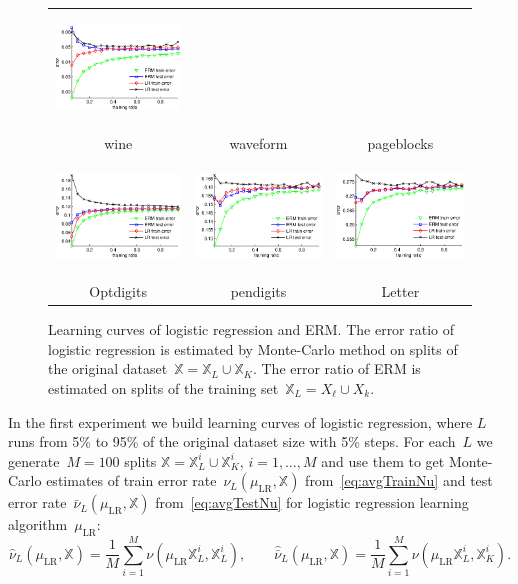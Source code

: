 \documentclass{article} %
\def\XX{\mathbb{X}}
\def\LR{\text{LR}}
\begin{document}
\begin{figure}[t]
\begin{tabular}{ccc}
        \includegraphics[width=44mm,height=30mm]{pageblocks.eps} \\
        wine &
        waveform &
        pageblocks \\
        \includegraphics[width=44mm,height=30mm]{Optdigits.eps} &
        \includegraphics[width=44mm,height=30mm]{pendigits.eps} &
        \includegraphics[width=44mm,height=30mm]{Letter.eps} \\
        Optdigits &
        pendigits &
        Letter \\
    \end{tabular}
    \caption{Learning curves of logistic regression and ERM.
        The error ratio of logistic regression is estimated by Monte-Carlo method on splits
        of the original dataset~$\XX = \XX_L \cup \XX_K$.
        The error ratio of ERM is estimated on splits of the training set~$\XX_L = X_\ell \cup X_k$.}
    \label{fig:LearningCurves}
\end{figure}


In the first experiment we build learning curves of logistic regression,
where $L$ runs from 5\% to 95\% of the original dataset size with 5\% steps.
For each~$L$ we generate~$M = 100$ splits ${\XX = \XX_L^i \cup \XX_K^i}$,\; ${i = 1, \dots, M}$
and use them to get Monte-Carlo estimates
of train error rate~$\nu_L(\mu_\LR, \XX)$ from~\eqref{eq:avgTrainNu}
and test error rate~$\bar \nu_L(\mu_\LR, \XX)$ from~\eqref{eq:avgTestNu}
for logistic regression learning algorithm~$\mu_\LR$:
\[
    \hat \nu_L(\mu_\LR, \XX)
    =
    \frac{1}{M} \sum_{i = 1}^{M} \nu(\mu_\LR \XX_L^i, \XX_L^i),
    \qquad
    \hat{\bar \nu}_L(\mu_\LR, \XX)
    =
    \frac{1}{M} \sum_{i = 1}^{M} \nu(\mu_\LR \XX_L^i, \XX_K^i).
\]
\end{document}

